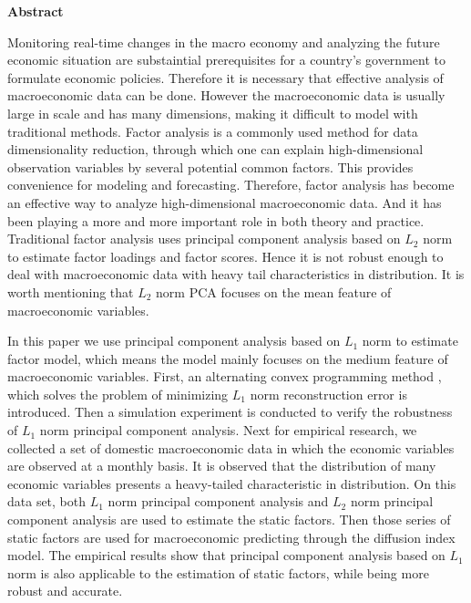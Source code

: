 \centerline{\large\bf Abstract}
\vspace{2ex}
Monitoring real-time changes in the macro economy and analyzing 
the future economic situation are substaintial prerequisites for 
a country's government to formulate economic policies.
Therefore it is necessary that effective analysis of macroeconomic data can be done. 
However the macroeconomic data is usually large in scale
and has many dimensions, making it difficult to model with traditional methods.
Factor analysis is a commonly used method for data dimensionality reduction, through which
one can explain high-dimensional observation variables by several potential common factors.
This provides convenience for modeling and forecasting.
Therefore, factor analysis has become an effective way to analyze 
high-dimensional macroeconomic data. And it has been playing a more and more
 important role in both theory and practice.
 Traditional factor analysis uses principal component analysis based 
 on $L_2$ norm to estimate factor loadings and factor scores. Hence it is not robust enough
  to deal with
macroeconomic data with heavy tail characteristics in distribution. It is worth mentioning that
 $L_2$ norm PCA focuses on the mean feature of macroeconomic variables.

\thispagestyle{plain}
In this paper we use principal component analysis based on $L_1$ norm to 
estimate factor model, which means the model mainly focuses on the medium feature of macroeconomic variables.
First, an alternating convex programming method , which solves 
the problem of minimizing $L_1$ norm reconstruction error 
is introduced. Then a simulation experiment is conducted to verify the robustness of $L_1$ norm
principal component analysis. 
Next for empirical research, we collected a set of
domestic macroeconomic data in which the economic variables are observed at a monthly basis.
It is observed that the distribution of many economic variables presents a heavy-tailed characteristic 
in distribution.
On this data set, both
$L_1$ norm principal component analysis and $L_2$ 
norm principal component analysis are used to estimate the static factors. Then 
those series of static factors are used for macroeconomic predicting through the diffusion index model.
The empirical results show that principal component analysis based on
$L_1$ norm is also applicable to the estimation of static factors, 
while being more robust and accurate.

